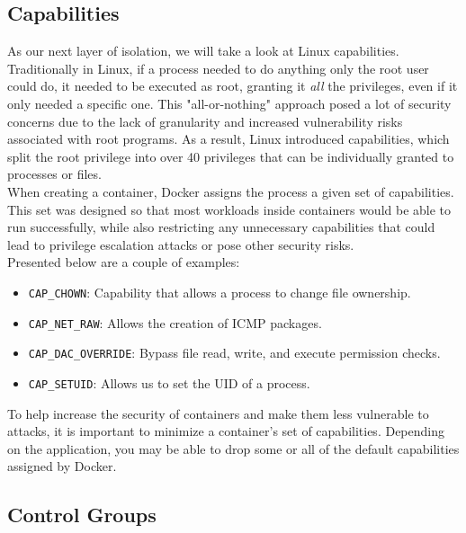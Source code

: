 \documentclass{article}
\begin{document}
\subsection{Capabilities}
As our next layer of isolation, we will take a look at Linux capabilities. Traditionally in Linux, 
if a process needed to do anything only the root user could do, it needed to be executed as root, granting 
it \textit{all} the privileges, even if it only needed a specific one. This "all-or-nothing" 
approach posed a lot of security concerns due to the lack of granularity and increased vulnerability 
risks associated with root programs. As a result, Linux introduced capabilities, 
which split the root privilege into over 40 privileges that can be individually granted to processes or files.\\
When creating a container, Docker assigns the process a given set of capabilities. 
This set was designed so that most workloads inside containers would be able to run successfully, 
while also restricting any unnecessary capabilities that could lead to privilege escalation 
attacks or pose other security risks.\\
Presented below are a couple of examples:
\begin{itemize}[itemsep=0pt]
    \item \texttt{CAP\_CHOWN}: Capability that allows a process to change file ownership.
    \item \texttt{CAP\_NET\_RAW}: Allows the creation of ICMP packages.
    \item \texttt{CAP\_DAC\_OVERRIDE}: Bypass file read, write, and execute permission checks.
    \item \texttt{CAP\_SETUID}: Allows us to set the UID of a process.
\end{itemize}
To help increase the security of containers and make them less vulnerable to attacks, 
it is important to minimize a container's set of capabilities. Depending on the application, 
you may be able to drop some or all of the default capabilities assigned by Docker.

\subsection{Control Groups}
\label{sec:ControlGroups}
\end{document}
